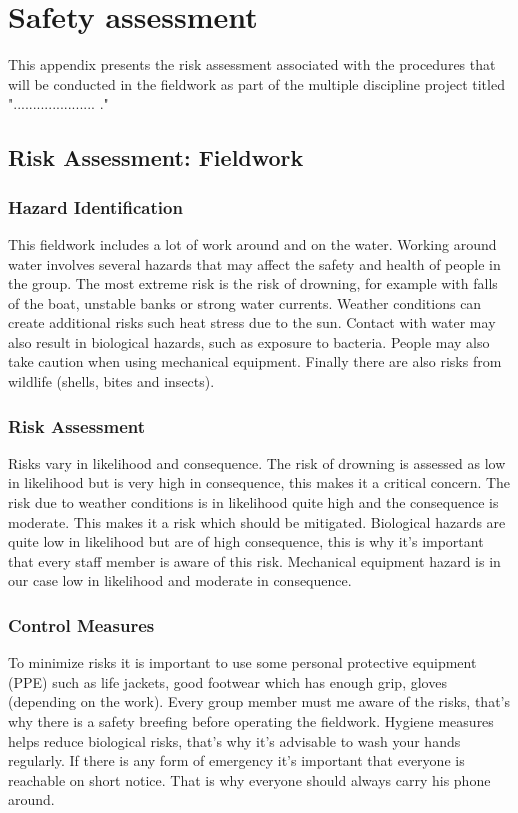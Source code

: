
\chapter{Safety assessment}

This appendix presents the risk assessment associated with the procedures that will be conducted in the fieldwork as part of the multiple discipline project titled "..................... ."

\section{Risk Assessment: Fieldwork}

\subsection{Hazard Identification}
This fieldwork includes a lot of work around and on the water. Working around water involves several hazards that may affect the safety and health of people in the group. The most extreme risk is the risk of drowning, for example with falls of the boat, unstable banks or strong water currents. Weather conditions can create additional risks such heat stress due to the sun. Contact with water may also result in biological hazards, such as exposure to bacteria. People may also take caution when using mechanical equipment. Finally there are also risks from wildlife (shells, bites and insects). 

\subsection{Risk Assessment}
Risks vary in likelihood and consequence. The risk of drowning is assessed as low in likelihood but is very high in consequence, this makes it a critical concern. The risk due to weather conditions is in likelihood quite high and the consequence is moderate. This makes it a risk which should be mitigated. Biological hazards are quite low in likelihood but are of high consequence, this is why it's important that every staff member is aware of this risk. Mechanical equipment hazard is in our case low in likelihood and moderate in consequence. 


\subsection{Control Measures}
To minimize risks it is important to use some personal protective equipment (PPE) such as life jackets, good footwear which has enough grip, gloves (depending on the work). Every group member must me aware of the risks, that's why there is a safety breefing before operating the fieldwork. Hygiene measures helps reduce biological risks, that's why it's advisable to wash your hands regularly. If there is any form of emergency it's important that everyone is reachable on short notice. That is why everyone should always carry his phone around. 